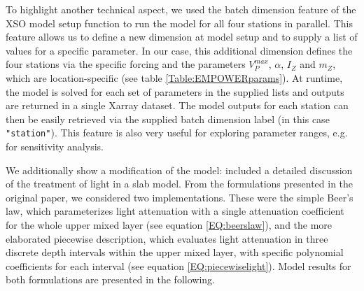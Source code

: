 \documentclass[journal abbreviation, manuscript]{copernicus}
\begin{document}
To highlight another technical aspect, we used the batch dimension feature of the XSO model setup function to run the model for all four stations in parallel. This feature allows us to define a new dimension at model setup and to supply a list of values for a specific parameter. In our case, this additional dimension defines the four stations via the specific forcing and the parameters $V_P^{max}$, $\alpha$, $I_Z$ and $m_Z$, which are location-specific (see table \ref{Table:EMPOWERparams}). At runtime, the model is solved for each set of parameters in the supplied lists and outputs are returned in a single Xarray dataset. The model outputs for each station can then be easily retrieved via the supplied batch dimension label (in this case \texttt{"station"}). This feature is also very useful for exploring parameter ranges, e.g. for sensitivity analysis.

We additionally show a modification of the model: \citet{Anderson2015c} included a detailed discussion of the treatment of light in a slab model. From the formulations presented in the original paper, we considered two implementations. These were the simple Beer's law, which parameterizes light attenuation with a single attenuation coefficient for the whole upper mixed layer (see equation \ref{EQ:beerslaw}), and the more elaborated piecewise description, which evaluates light attenuation in three discrete depth intervals within the upper mixed layer, with specific polynomial coefficients for each interval (see equation \ref{EQ:piecewiselight}). Model results for both formulations are presented in the following.
\end{document}
